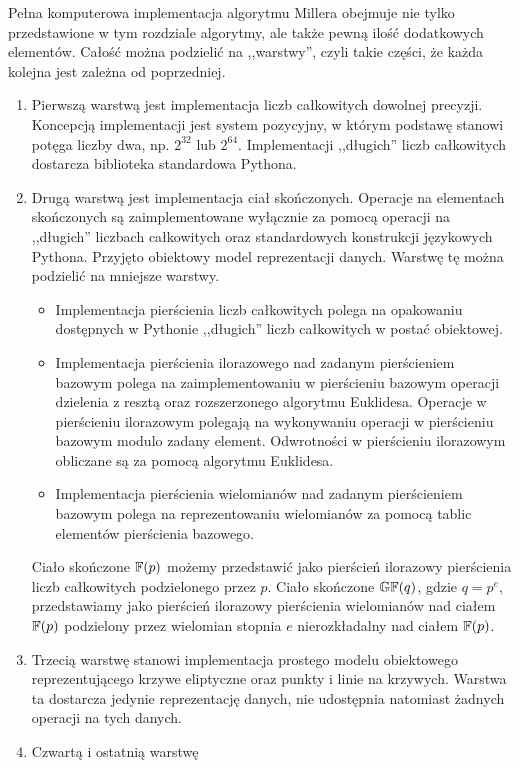 \noindent
Pełna komputerowa implementacja algorytmu Millera
obejmuje nie tylko przedstawione w tym rozdziale algorytmy,
ale także pewną ilość dodatkowych elementów.
Całość można podzielić na ,,warstwy'',
czyli takie części, że każda kolejna jest zależna od poprzedniej.
\begin{enumerate}
\item
Pierwszą warstwą jest implementacja liczb całkowitych dowolnej precyzji.
Koncepcją implementacji jest system pozycyjny,
w którym podstawę stanowi potęga liczby dwa, np. $2^{32}$ lub $2^{64}$.
Implementacji ,,długich'' liczb całkowitych
dostarcza biblioteka standardowa Pythona.
\item
Drugą warstwą jest implementacja ciał skończonych.
Operacje na elementach skończonych są zaimplementowane
wyłącznie za pomocą operacji na ,,długich'' liczbach całkowitych
oraz standardowych konstrukcji językowych Pythona.
Przyjęto obiektowy model reprezentacji danych.
Warstwę tę można podzielić na mniejsze warstwy.
\begin{itemize}
\item
Implementacja pierścienia liczb całkowitych polega na opakowaniu
dostępnych w Pythonie ,,długich'' liczb całkowitych w postać obiektowej.
\item
Implementacja pierścienia ilorazowego nad zadanym pierścieniem bazowym
polega na zaimplementowaniu w pierścieniu bazowym
operacji dzielenia z resztą oraz rozszerzonego algorytmu Euklidesa.
Operacje w pierścieniu ilorazowym polegają
na wykonywaniu operacji w pierścieniu bazowym modulo zadany element.
Odwrotności w pierścieniu ilorazowym obliczane są
za pomocą algorytmu Euklidesa.
\item
Implementacja pierścienia wielomianów nad zadanym pierścieniem bazowym
polega na reprezentowaniu wielomianów
za pomocą tablic elementów pierścienia bazowego.
\end{itemize}
Ciało skończone $\mathbb{F}(p)$
możemy przedstawić jako pierścień ilorazowy
pierścienia liczb całkowitych podzielonego przez $p$.
Ciało skończone $\mathbb{GF}(q)$, gdzie $q = p^e$,
przedstawiamy jako pierścień ilorazowy
pierścienia wielomianów nad ciałem $\mathbb{F}(p)$
podzielony przez wielomian stopnia $e$
nierozkładalny nad ciałem $\mathbb{F}(p)$.
\item
Trzecią warstwę stanowi implementacja prostego modelu obiektowego
reprezentującego krzywe eliptyczne oraz punkty i linie na krzywych.
Warstwa ta dostarcza jedynie reprezentację danych,
nie udostępnia natomiast żadnych operacji na tych danych.
\item
Czwartą i ostatnią warstwę

\end{enumerate}
